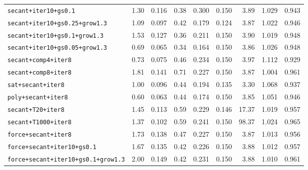 \documentclass[11pt]{article}
\begin{document}
\begin{table}
\begin{tabular}{lrrrrrrrr}
\texttt{secant{+}iter10{+}gs0.1} & 1.30 & 0.116 & 0.38 & 0.300 & 0.150 & 3.89 & 1.029 & 0.943 \\
\texttt{secant{+}iter10{+}gs0.25{+}grow1.3} & 1.09 & 0.097 & 0.42 & 0.179 & 0.124 & 3.87 & 1.022 & 0.946 \\
\texttt{secant{+}iter10{+}gs0.1{+}grow1.3} & 1.53 & 0.127 & 0.36 & 0.211 & 0.150 & 3.90 & 1.019 & 0.948 \\
\texttt{secant{+}iter10{+}gs0.05{+}grow1.3} & 0.69 & 0.065 & 0.34 & 0.164 & 0.150 & 3.86 & 1.026 & 0.948 \\
\texttt{secant{+}comp4{+}iter8} & 0.73 & 0.075 & 0.46 & 0.234 & 0.150 & 3.97 & 1.112 & 0.929 \\
\texttt{secant{+}comp8{+}iter8} & 1.81 & 0.141 & 0.71 & 0.227 & 0.150 & 3.87 & 1.004 & 0.961 \\
\texttt{sat{+}secant{+}iter8} & 1.00 & 0.096 & 0.44 & 0.194 & 0.135 & 3.30 & 1.068 & 0.937 \\
\texttt{poly{+}secant{+}iter8} & 0.60 & 0.063 & 0.44 & 0.174 & 0.150 & 3.85 & 1.051 & 0.946 \\
\texttt{secant{+}T20{+}iter8} & 1.45 & 0.113 & 0.59 & 0.229 & 0.146 & 17.37 & 1.019 & 0.957 \\
\texttt{secant{+}T1000{+}iter8} & 1.37 & 0.102 & 0.59 & 0.241 & 0.150 & 98.37 & 1.024 & 0.965 \\
\texttt{force{+}secant{+}iter8} & 1.73 & 0.138 & 0.47 & 0.227 & 0.150 & 3.87 & 1.013 & 0.956 \\
\texttt{force{+}secant{+}iter10{+}gs0.1} & 1.67 & 0.135 & 0.42 & 0.226 & 0.150 & 3.88 & 1.012 & 0.957 \\
\texttt{force{+}secant{+}iter10{+}gs0.1{+}grow1.3} & 2.00 & 0.149 & 0.42 & 0.231 & 0.150 & 3.88 & 1.010 & 0.961 \\
\bottomrule
\end{tabular}
\end{table}
\end{document}
